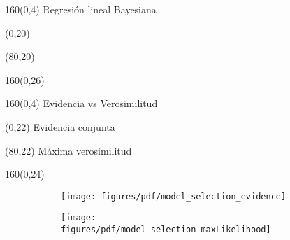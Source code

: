 \documentclass[shownotes,aspectratio=169]{beamer}
\begin{document}
\begin{frame}[plain]
\begin{textblock}{160}(0,4)
\centering  \Large Regresi\'on lineal Bayesiana
\end{textblock}


\begin{textblock}{80}(0,20)
 \centering
\end{textblock}

\begin{textblock}{80}(80,20)
 \centering
\end{textblock}

\begin{textblock}{160}(0,26)
     \centering 
\end{textblock}

\end{frame}

\begin{frame}[plain]
\begin{textblock}{160}(0,4)
 \centering \Large Evidencia vs Verosimilitud
\end{textblock}


\begin{textblock}{80}(0,22)
 \centering
Evidencia conjunta
\end{textblock}

\begin{textblock}{80}(80,22)
 \centering
 M\'axima verosimilitud
\end{textblock}


\begin{textblock}{160}(0,24)
     \centering 
       \begin{figure}[H]     
     \centering 
     \begin{subfigure}[b]{0.47\textwidth}
       \texttt{[image: figures/pdf/model\_selection\_evidence]}
     \end{subfigure}
     \begin{subfigure}[b]{0.49\textwidth}
       \texttt{[image: figures/pdf/model\_selection\_maxLikelihood]}
     \end{subfigure}
\end{figure}
\end{textblock}

\end{frame}
\end{document}
